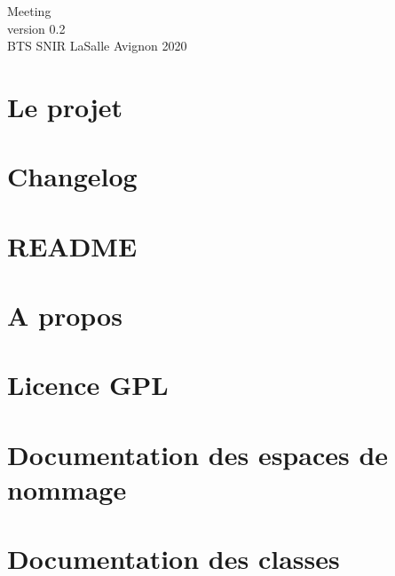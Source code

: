 \documentclass[twoside]{article}
\newcommand{\+}{\discretionary{\mbox{\scriptsize$\hookleftarrow$}}{}{}}
\begin{document}
\hypersetup{pageanchor=false,
             bookmarksnumbered=true,
             pdfencoding=unicode
            }
\begin{titlepage}
\vspace*{7cm}

\begin{center}%
{\LARGE Meeting}\\
\vspace*{1cm}
{\large version 0.\+2}\\
\vspace*{1cm}
{\large B\+T\+S S\+N\+I\+R La\+Salle Avignon 2020}\\
\end{center}
\end{titlepage}
\tableofcontents
{}
\hypersetup{pageanchor=true}

\section{Le projet}
\label{index}\hypertarget{index}{}
\section{Changelog}
\label{page_changelog}

\section{R\+E\+A\+D\+ME}
\label{page__r_e_a_d_m_e}

\section{A propos}
\label{page_about}

\section{Licence G\+PL}
\label{page_licence}

\section{Documentation des espaces de nommage}



\section{Documentation des classes}








\end{document}

